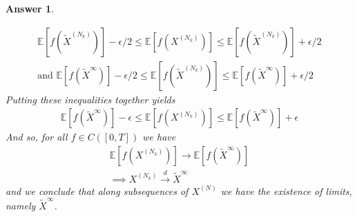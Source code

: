 \documentclass[12pt]{article}
\theoremstyle{colon}
\newtheorem*{answer}{Answer}
\begin{document}
\begin{answer}
\begin{enumerate}[label=\alph*)]
      \begin{gather*}
        \mathbb{E} [ f(\tilde{X}^{(N_k)})] - \epsilon/2 \leq \mathbb{E} [ f(X^{(N_k)})] \leq \mathbb{E} [ f(\tilde{X}^{(N_k)})] + \epsilon/2 \\
        \text{and } \mathbb{E} [ f(\tilde{X}^\infty)] - \epsilon/2 \leq \mathbb{E} [ f(\tilde{X}^{(N_k)})] \leq \mathbb{E} [ f(\tilde{X}^\infty)] + \epsilon/2
      \end{gather*}
      Putting these inequalities together yields
      \begin{gather*}
        \mathbb{E} [ f(\tilde{X}^\infty)] - \epsilon \leq \mathbb{E} [ f(X^{(N_k)})] \leq \mathbb{E} [ f(\tilde{X}^\infty)] + \epsilon
      \end{gather*}
      And so, for all $f \in C([0,T])$ we have
      \begin{gather*}
        \mathbb{E} [ f(X^{(N_k)})] \rightarrow \mathbb{E} [ f(\tilde{X}^\infty)] \\
        \implies X^{(N_k)} \xrightarrow{d} \tilde{X}^\infty
      \end{gather*}
      and we conclude that along subsequences of $X^{(N)}$ we have the existence of limits, namely $\tilde{X}^\infty$.


\end{enumerate}
\end{answer}
\end{document}
